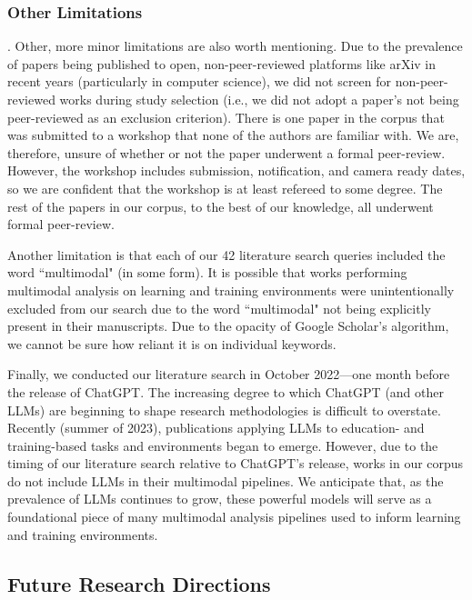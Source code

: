 \documentclass[manuscript,screen,review]{acmart}
\begin{document}
\subsubsection{Other Limitations}.
Other, more minor limitations are also worth mentioning. Due to the prevalence of papers being published to open, non-peer-reviewed platforms like arXiv in recent years (particularly in computer science), we did not screen for non-peer-reviewed works during study selection (i.e., we did not adopt a paper's not being peer-reviewed as an exclusion criterion). There is one paper in the corpus that was submitted to a workshop that none of the authors are familiar with. We are, therefore, unsure of whether or not the paper underwent a formal peer-review. However, the workshop includes submission, notification, and camera ready dates, so we are confident that the workshop is at least refereed to some degree. The rest of the papers in our corpus, to the best of our knowledge, all underwent formal peer-review.

Another limitation is that each of our 42 literature search queries included the word ``multimodal" (in some form). It is possible that works performing multimodal analysis on learning and training environments were unintentionally excluded from our search due to the word ``multimodal" not being explicitly present in their manuscripts. Due to the opacity of Google Scholar's algorithm, we cannot be sure how reliant it is on individual keywords. 

Finally, we conducted our literature search in October 2022---one month before the release of ChatGPT. The increasing degree to which ChatGPT (and other LLMs) are beginning to shape research methodologies is difficult to overstate. Recently (summer of 2023), publications applying LLMs to education- and training-based tasks and environments began to emerge. However, due to the timing of our literature search relative to ChatGPT's release, works in our corpus do not include LLMs in their multimodal pipelines. We anticipate that, as the prevalence of LLMs continues to grow, these powerful models will serve as a foundational piece of many multimodal analysis pipelines used to inform learning and training environments.

\subsection{Future Research Directions} 
\end{document}
